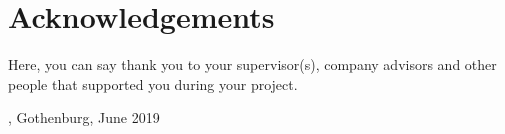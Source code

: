 \thispagestyle{plain}			%
\section*{Acknowledgements}
Here, you can say thank you to your supervisor(s), company advisors and other people that supported you during your project.

\vspace{1.5cm}
\hfill
\me, Gothenburg, June 2019

\newpage				%
\thispagestyle{empty}
\mbox{}
